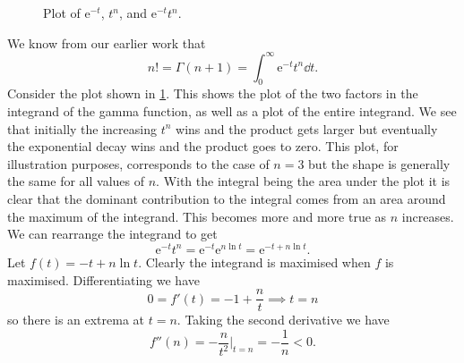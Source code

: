 \documentclass[fleqn]{NotesClass}
\newcommand*{\e}{\mathrm{e}}
\begin{document}
    \begin{figure}
        \caption{Plot of \(\e^{-t}\), \(t^{n}\), and \(\e^{-t}t^{n}\).}
        \label{fig:plot for stirling}
    \end{figure}
    
    We know from our earlier work that
    \begin{equation}
        n! = \Gamma(n + 1) = \int_{0}^{\infty} \e^{-t}t^n \dd{t}.
    \end{equation}
    Consider the plot shown in \cref{fig:plot for stirling}.
    This shows the plot of the two factors in the integrand of the gamma function, as well as a plot of the entire integrand.
    We see that initially the increasing \(t^{n}\) wins and the product gets larger but eventually the exponential decay wins and the product goes to zero.
    This plot, for illustration purposes, corresponds to the case of \(n = 3\) but the shape is generally the same for all values of \(n\).
    With the integral being the area under the plot it is clear that the dominant contribution to the integral comes from an area around the maximum of the integrand.
    This becomes more and more true as \(n\) increases.
    We can rearrange the integrand to get
    \begin{equation}
        \e^{-t} t^{n} = \e^{-t}\e^{n\ln t} = \e^{-t + n\ln t}.
    \end{equation}
    Let \(f(t) = -t + n\ln t\).
    Clearly the integrand is maximised when \(f\) is maximised.
    Differentiating we have
    \begin{equation}
        0 = f'(t) = -1 + \frac{n}{t} \implies t = n
    \end{equation}
    so there is an extrema at \(t = n\).
    Taking the second derivative we have
    \begin{equation}
        f''(n) = -\frac{n}{t^2}\bigg\vert_{t=n} = -\frac{1}{n} < 0.
    \end{equation}
    
\end{document}
